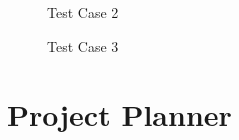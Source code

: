 \documentclass[oneside,a4paper,12pt]{report}
\begin{document}
{\begin{appendices}
\begin{center}
	\begin{figure}[H]
		\centering
	  \caption{Test Case 2}
	  \label{fig:state-dig}
	\end{figure}
\end{center} 

\begin{center}
	\begin{figure}[H]
		\centering
	  \caption{Test Case 3}
	  \label{fig:state-dig}
	\end{figure}
\end{center} 

\chapter{Project Planner}
\label{app:plan}


\end{appendices}}
\end{document}
